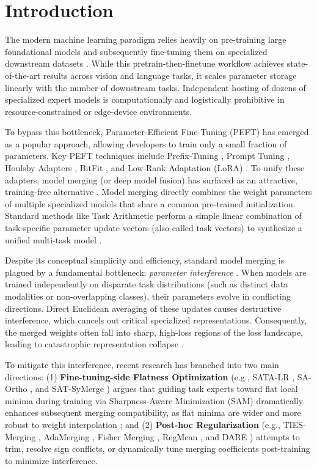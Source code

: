 \documentclass{article}
\theoremstyle{plain}
\theoremstyle{definition}
\theoremstyle{remark}
\begin{document}
\section{Introduction}
\label{sec:intro}

The modern machine learning paradigm relies heavily on pre-training large foundational models and subsequently fine-tuning them on specialized downstream datasets \cite{devlin2018bert, russakovsky2015imagenet}. While this pretrain-then-finetune workflow achieves state-of-the-art results across vision \cite{he2016deep, dosovitskiy2020image} and language tasks, it scales parameter storage linearly with the number of downstream tasks. Independent hosting of dozens of specialized expert models is computationally and logistically prohibitive in resource-constrained or edge-device environments.

To bypass this bottleneck, Parameter-Efficient Fine-Tuning (PEFT) has emerged as a popular approach, allowing developers to train only a small fraction of parameters. Key PEFT techniques include Prefix-Tuning \cite{li2021prefix}, Prompt Tuning \cite{lester2021power}, Houlsby Adapters \cite{houlsby2019parameter}, BitFit \cite{zaken2021bitfit}, and Low-Rank Adaptation (LoRA) \cite{lora}. To unify these adapters, model merging (or deep model fusion) has surfaced as an attractive, training-free alternative \cite{task_arithmetic}. Model merging directly combines the weight parameters of multiple specialized models that share a common pre-trained initialization. Standard methods like Task Arithmetic perform a simple linear combination of task-specific parameter update vectors (also called task vectors) to synthesize a unified multi-task model \cite{task_arithmetic}. 

Despite its conceptual simplicity and efficiency, standard model merging is plagued by a fundamental bottleneck: \textit{parameter interference} \cite{ties}. When models are trained independently on disparate task distributions (such as distinct data modalities or non-overlapping classes), their parameters evolve in conflicting directions. Direct Euclidean averaging of these updates causes destructive interference, which cancels out critical specialized representations. Consequently, the merged weights often fall into sharp, high-loss regions of the loss landscape, leading to catastrophic representation collapse \cite{jordan2023repair, frankle2020linear}.

To mitigate this interference, recent research has branched into two main directions: (1) \textbf{Fine-tuning-side Flatness Optimization} (e.g., SATA-LR \cite{sata-lr}, SA-Ortho \cite{sa-ortho}, and SAT-SyMerge \cite{sat-symerge}) argues that guiding task experts toward flat local minima during training via Sharpness-Aware Minimization (SAM) \cite{sam} dramatically enhances subsequent merging compatibility, as flat minima are wider and more robust to weight interpolation \cite{izmailov2018averaging}; and (2) \textbf{Post-hoc Regularization} (e.g., TIES-Merging \cite{ties}, AdaMerging \cite{adamerging}, Fisher Merging \cite{matena2022merging}, RegMean \cite{jin2023dataless}, and DARE \cite{yu2024language}) attempts to trim, resolve sign conflicts, or dynamically tune merging coefficients post-training to minimize interference.
\end{document}

